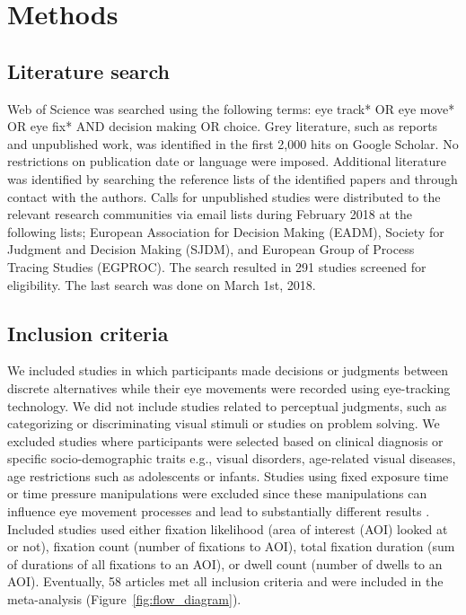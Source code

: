 \documentclass[english,natbib,man,floatsintext]{apa6}
\begin{document}
\section{Methods}

\subsection{Literature search}

Web of Science was searched using the following terms: eye track* OR eye move* OR eye fix* AND decision making OR choice. Grey literature, such as reports and unpublished work, was identified in the first 2,000 hits on Google Scholar. No restrictions on publication date or language were imposed. Additional literature was identified by searching the reference lists of the identified papers and through contact with the authors. Calls for unpublished studies were distributed to the relevant research communities via email lists during February 2018 at the following lists; European Association for Decision Making (EADM), Society for Judgment and Decision Making (SJDM), and European Group of Process Tracing Studies (EGPROC). The search resulted in 291 studies screened for eligibility. The last search was done on March 1st, 2018.


\subsection{Inclusion criteria}

We included studies in which participants made decisions or judgments between discrete alternatives while their eye movements were recorded using eye-tracking technology. We did not include studies related to perceptual judgments, such as categorizing or discriminating visual stimuli or studies on problem solving. We excluded studies where participants were selected based on clinical diagnosis or specific socio-demographic traits e.g., visual disorders, age-related visual diseases, age restrictions such as adolescents or infants. Studies using fixed exposure time or time pressure manipulations were excluded since these manipulations can influence eye movement processes \citep{orquin2018a} and lead to substantially different results \citep{simola2019a}. Included studies used either fixation likelihood (area of interest (AOI) looked at or not), fixation count (number of fixations to AOI), total fixation duration (sum of durations of all fixations to an AOI), or dwell count (number of dwells to an AOI). Eventually, 58 articles met all inclusion criteria and were included in the meta-analysis (Figure~\ref{fig:flow_diagram}).
\end{document}
